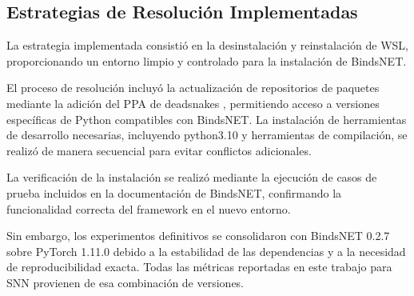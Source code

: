 \subsection{Estrategias de Resolución Implementadas}

La estrategia implementada consistió en la desinstalación y reinstalación de WSL, proporcionando un entorno limpio y controlado para la instalación de BindsNET.

El proceso de resolución incluyó la actualización de repositorios de paquetes mediante la adición del PPA de deadsnakes \cite{deadsnakes2025}, permitiendo acceso a versiones específicas de Python compatibles con BindsNET. La instalación de herramientas de desarrollo necesarias, incluyendo python3.10 y herramientas de compilación, se realizó de manera secuencial para evitar conflictos adicionales.

La verificación de la instalación se realizó mediante la ejecución de casos de prueba incluidos en la documentación de BindsNET, confirmando la funcionalidad correcta del framework en el nuevo entorno.

Sin embargo, los experimentos definitivos se consolidaron con BindsNET 0.2.7 sobre PyTorch 1.11.0 debido a la estabilidad de las dependencias y a la necesidad de reproducibilidad exacta. Todas las métricas reportadas en este trabajo para SNN provienen de esa combinación de versiones.